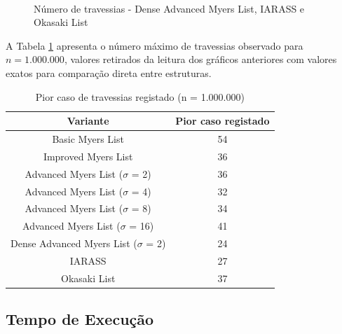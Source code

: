 \begin{figure}[H]
    \centering
    
    \hfill
    \subfloat[IARASS]{
        
    }
    \\
    
    
    \caption{Número de travessias - Dense Advanced Myers List, IARASS e Okasaki List}
    \label{fig:travessias_2}
\end{figure}


A Tabela \ref{tab:pior_caso} apresenta o número máximo de travessias observado 
para $n = 1.000.000$, valores retirados da leitura dos gráficos 
anteriores com valores exatos para comparação direta entre estruturas.


\begin{table}[H]
    \centering
    \begin{tabular}{cc}
        \textbf{Variante} & \textbf{Pior caso registado} \\
        \hline
         Basic Myers List & 54 \\
         \hline
         Improved Myers List & 36 \\
         \hline
         Advanced Myers List ($\sigma$ = 2) & 36 \\
         \hline
         Advanced Myers List ($\sigma$ = 4) & 32 \\
         \hline
         Advanced Myers List ($\sigma$ = 8) & 34 \\
         \hline
         Advanced Myers List ($\sigma$ = 16) & 41 \\
         \hline
         Dense Advanced Myers List ($\sigma$ = 2) & 24\\
         \hline
         IARASS & 27\\
         \hline
         Okasaki List & 37\\
         \hline
    \end{tabular}
    \caption{Pior caso de travessias registado (n = 1.000.000)}
    \label{tab:pior_caso}
\end{table}


\subsection{Tempo de Execução}

